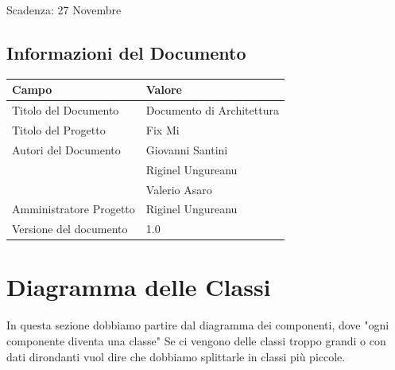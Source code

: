 \documentclass{report}
\begin{document}
	Scadenza: 27 Novembre
	
	
	
	\section{Informazioni del Documento}
	
	\begin{center} %
		\centering
		\begin{tabular}{ |p{4cm}|p{4cm}|  }
			\hline
			\centering Campo & \qquad\qquad Valore \\ %
			\hline
			Titolo del Documento & Documento di Architettura \\
			\hline
			Titolo del Progetto & Fix Mi \\
			\hline
			Autori del Documento &
			Giovanni Santini \\ & Riginel Ungureanu \\ & Valerio Asaro \\
			\hline
			Amministratore Progetto & Riginel Ungureanu\\
			\hline
			Versione del documento & 1.0 \\
			\hline
		\end{tabular}
	\end{center}
	
	
	
\chapter{Diagramma delle Classi}

In questa sezione dobbiamo partire dal diagramma dei componenti, dove "ogni componente diventa una classe"
Se ci vengono delle classi troppo grandi o con dati dirondanti vuol dire che dobbiamo splittarle in classi più piccole.
\end{document}

